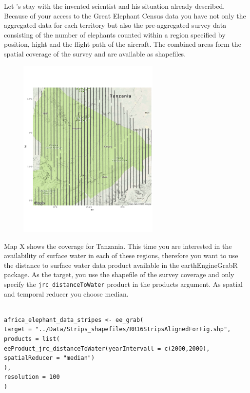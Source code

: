 Let 's stay with the invented scientist and his situation already described. Because of your access to the Great Elephant Census data you have not only the aggregated data for each territory but also the pre-aggregated survey data consisting of the number of elephants counted within a region specified by position, hight and the flight path of the aircraft. The combined areas form the spatial coverage of the survey and are available as shapefiles.


	
\begin{figure}
	\begin{center}
		\includegraphics[width=7cm]{images/stripes.pdf}
	\end{center}
\end{figure}



Map X shows the coverage for Tanzania. This time you are interested in the availability of surface water in each of these regions, therefore you want to use the distance to surface water data product available in the earthEngineGrabR package. As the target, you use the shapefile of the survey coverage and only specify the \texttt{jrc\_distanceToWater} product in the products argument. As spatial and temporal reducer you choose median. 

\begin{lstlisting}

africa_elephant_data_stripes <- ee_grab(
target = "../Data/Strips_shapefiles/RR16StripsAlignedForFig.shp", 
products = list(
eeProduct_jrc_distanceToWater(yearIntervall = c(2000,2000), spatialReducer = "median")
),
resolution = 100
)
\end{lstlisting}


